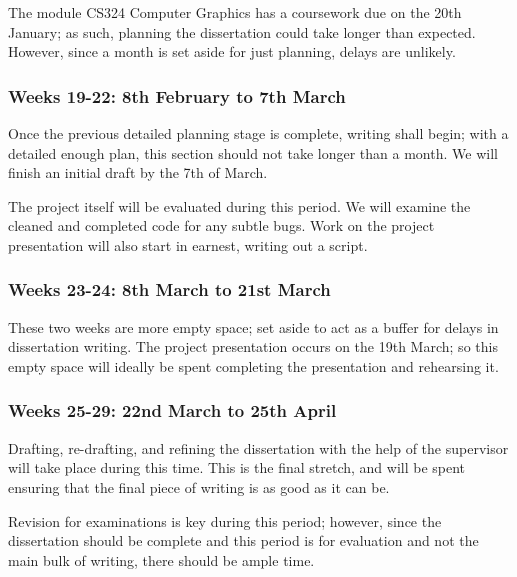 \documentclass[12pt, a4paper, bibliography=totocnumbered]{scrartcl}
\begin{document}
The module CS324 Computer Graphics has a coursework due on the 20th January; as such, planning the dissertation could take longer than expected. However, since a month is set aside for just planning, delays are unlikely.

\subsubsection{Weeks 19-22: 8th February to 7th March}

Once the previous detailed planning stage is complete, writing shall begin; with a detailed enough plan, this section should not take longer than a month. We will finish an initial draft by the 7th of March.

The project itself will be evaluated during this period. We will examine the cleaned and completed code for any subtle bugs. Work on the project presentation will also start in earnest, writing out a script.

\subsubsection{Weeks 23-24: 8th March to 21st March}

These two weeks are more empty space; set aside to act as a buffer for delays in dissertation writing. The project presentation occurs on the 19th March; so this empty space will ideally be spent completing the presentation and rehearsing it.

\subsubsection{Weeks 25-29: 22nd March to 25th April}

Drafting, re-drafting, and refining the dissertation with the help of the supervisor will take place during this time. This is the final stretch, and will be spent ensuring that the final piece of writing is as good as it can be.

Revision for examinations is key during this period; however, since the dissertation should be complete and this period is for evaluation and not the main bulk of writing, there should be ample time.


\end{document}
